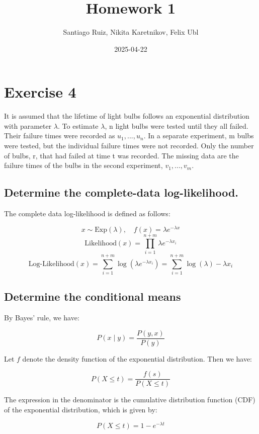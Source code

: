\documentclass[
]{article}
\title{\textbf{Homework 1}}
\author{Santiago Ruiz, Nikita Karetnikov, Felix Ubl}
\date{2025-04-22}
\begin{document}
\maketitle

\section{Exercise 4}\label{exercise-4}

It is assumed that the lifetime of light bulbs follows an exponential
distribution with parameter \(\lambda\). To estimate \(\lambda\), n
light bulbs were tested until they all failed. Their failure times were
recorded as \(u_{1}, . . . , u_{n}\). In a separate experiment, m bulbs
were tested, but the individual failure times were not recorded. Only
the number of bulbs, r, that had failed at time t was recorded. The
missing data are the failure times of the bulbs in the second
experiment, \(v_{1}, . . . , v_{m}\).

\subsection{Determine the complete-data
log-likelihood.}\label{determine-the-complete-data-log-likelihood.}

The complete data log-likelihood is defined as follows:

\[
x \sim \text{Exp}(\lambda), \quad f(x) = \lambda e^{-\lambda x}
\] \[
\text{Likelihood}(x) = \prod_{i=1}^{n+m} \lambda e^{-\lambda x_{i}}
\] \[
\text{Log-Likelihood}(x) = \sum_{i=1}^{n+m} \log(\lambda e^{-\lambda x_{i}}) = \sum_{i=1}^{n+m} \log(\lambda) - \lambda x_{i}
\]

\subsection{Determine the conditional
means}\label{determine-the-conditional-means}

By Bayes' rule, we have:

\[
P(x \mid y) = \frac{P(y, x)}{P(y)}
\]

Let \(f\) denote the density function of the exponential distribution.
Then we have:

\[
P(X \leq t) = \frac{f(s)}{P(X \leq t)}
\]

The expression in the denominator is the cumulative distribution
function (CDF) of the exponential distribution, which is given by:

\[
P(X \leq t) = 1 - e^{-\lambda t}
\]
\end{document}
